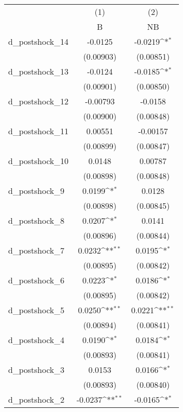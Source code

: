 {
\def\sym#1{\ifmmode^{#1}\else\(^{#1}\)\fi}
\begin{tabular}{l*{2}{c}}
\hline\hline
          &\multicolumn{1}{c}{(1)}&\multicolumn{1}{c}{(2)}\\
          &\multicolumn{1}{c}{B}&\multicolumn{1}{c}{NB}\\
\hline
d\_postshock\_14&  -0.0125         &  -0.0219\sym{*}  \\
          &(0.00903)         &(0.00851)         \\
d\_postshock\_13&  -0.0124         &  -0.0185\sym{*}  \\
          &(0.00901)         &(0.00850)         \\
d\_postshock\_12& -0.00793         &  -0.0158         \\
          &(0.00900)         &(0.00848)         \\
d\_postshock\_11&  0.00551         & -0.00157         \\
          &(0.00899)         &(0.00847)         \\
d\_postshock\_10&   0.0148         &  0.00787         \\
          &(0.00898)         &(0.00848)         \\
d\_postshock\_9&   0.0199\sym{*}  &   0.0128         \\
          &(0.00898)         &(0.00845)         \\
d\_postshock\_8&   0.0207\sym{*}  &   0.0141         \\
          &(0.00896)         &(0.00844)         \\
d\_postshock\_7&   0.0232\sym{**} &   0.0195\sym{*}  \\
          &(0.00895)         &(0.00842)         \\
d\_postshock\_6&   0.0223\sym{*}  &   0.0186\sym{*}  \\
          &(0.00895)         &(0.00842)         \\
d\_postshock\_5&   0.0250\sym{**} &   0.0221\sym{**} \\
          &(0.00894)         &(0.00841)         \\
d\_postshock\_4&   0.0190\sym{*}  &   0.0184\sym{*}  \\
          &(0.00893)         &(0.00841)         \\
d\_postshock\_3&   0.0153         &   0.0166\sym{*}  \\
          &(0.00893)         &(0.00840)         \\
d\_postshock\_2&  -0.0237\sym{**} &  -0.0165\sym{*}  \\

\end{tabular}}
